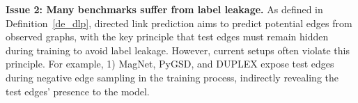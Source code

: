 



\textbf{Issue 2: Many benchmarks suffer from label leakage.}
As defined in Definition~\ref{de_dlp}, directed link prediction aims to predict potential edges from observed graphs, with the key principle that test edges must remain hidden during training to avoid label leakage. However, current setups often violate this principle. For example, 
1) MagNet, PyGSD, and DUPLEX expose test edges during negative edge sampling in the training process, indirectly revealing the test edges' presence to the model.

